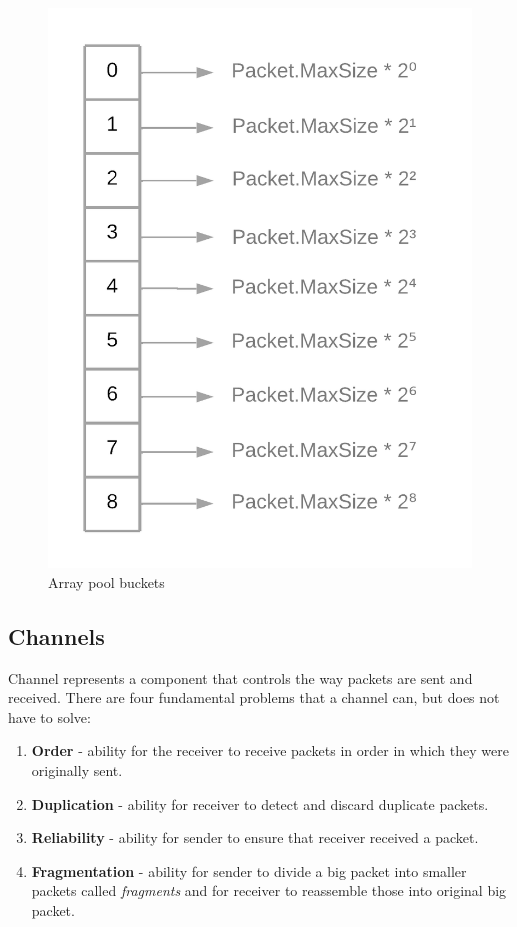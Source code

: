 \documentclass[times, utf8, diplomski]{fer}
\begin{document}
\begin{figure}[h!]
	\centering
	\includegraphics[scale=0.2]{Array-pool-buckets}
	\caption{Array pool buckets}
\end{figure}



\subsection{Channels}
Channel represents a component that controls the way packets are sent and received. There are four fundamental problems that a channel can, but does not have to solve:

\begin{enumerate}
	\item \textbf{Order} - ability for the receiver to receive packets in order in which they were originally sent.
	\item \textbf{Duplication} - ability for receiver to detect and discard duplicate packets.
	\item \textbf{Reliability} - ability for sender to ensure that receiver received a packet.
	\item \textbf{Fragmentation} - ability for sender to divide a big packet into smaller packets called \textit{fragments} and for receiver to reassemble those into original big packet.
\end{enumerate}
\end{document}
